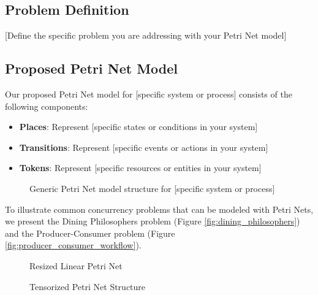 \subsection{Problem Definition}

[Define the specific problem you are addressing with your Petri Net model]

\subsection{Proposed Petri Net Model}

Our proposed Petri Net model for [specific system or process] consists of the following components:

\begin{itemize}
    \item \textbf{Places}: Represent [specific states or conditions in your system]
    \item \textbf{Transitions}: Represent [specific events or actions in your system]
    \item \textbf{Tokens}: Represent [specific resources or entities in your system]
\end{itemize}

\begin{figure}[htbp]
\centering

\caption{Generic Petri Net model structure for [specific system or process]}
\label{fig:petri_net_generic_model}
\end{figure}

To illustrate common concurrency problems that can be modeled with Petri Nets, we present the Dining Philosophers problem (Figure \ref{fig:dining_philosophers}) and the Producer-Consumer problem (Figure \ref{fig:producer_consumer_workflow}).

\begin{figure*}[htbp]
\centering

\caption{Petri Net model of the Dining Philosophers problem}
\label{fig:dining_philosophers}
\end{figure*}

\begin{figure}[htbp]
\centering
\resizebox{0.88\columnwidth}{!}{}
\caption{Resized Linear Petri Net}
\label{fig:linear_petri_resized}
\end{figure}

\begin{figure}[htbp]
\centering

\caption{Tensorized Petri Net Structure}
\label{fig:tensor_petri}
\end{figure}

